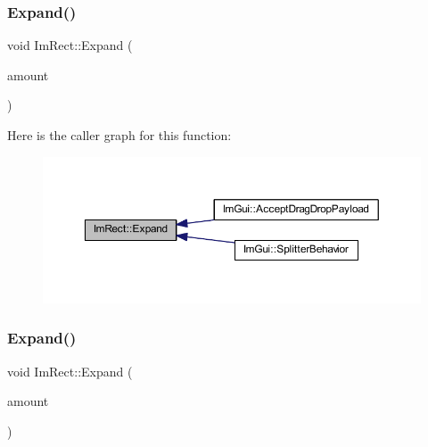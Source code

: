 \mbox{\label{struct_im_rect_af33a7424c3341d08acd69da30c27c753}} 
\subsubsection{\texorpdfstring{Expand()}{Expand()}\hspace{0.1cm}{\footnotesize\ttfamily [1/2]}}
{\footnotesize\ttfamily void Im\+Rect\+::\+Expand (\begin{DoxyParamCaption}\item[{const float}]{amount }\end{DoxyParamCaption})\hspace{0.3cm}{\ttfamily [inline]}}

Here is the caller graph for this function\+:
\nopagebreak
\begin{figure}[H]
\begin{center}
\leavevmode
\includegraphics[width=350pt]{struct_im_rect_af33a7424c3341d08acd69da30c27c753_icgraph}
\end{center}
\end{figure}
\mbox{\label{struct_im_rect_ac0b0b88fe65725b4694cd7d91d42d382}} 
\subsubsection{\texorpdfstring{Expand()}{Expand()}\hspace{0.1cm}{\footnotesize\ttfamily [2/2]}}
{\footnotesize\ttfamily void Im\+Rect\+::\+Expand (\begin{DoxyParamCaption}\item[{const \mbox{\hyperlink{struct_im_vec2}{Im\+Vec2}} \&}]{amount }\end{DoxyParamCaption})\hspace{0.3cm}{\ttfamily [inline]}}

